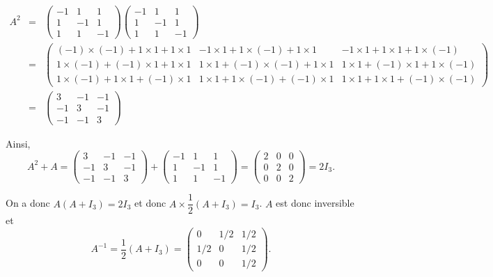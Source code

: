 \documentclass[11pt,fleqn]{book} %
\begin{document}
\begin{solution}\[\begin{array}{rcl}A^2 & =& \begin{pmatrix}-1 & 1 & 1\\1&-1&1\\1&1&-1 \end{pmatrix}\begin{pmatrix}-1 & 1 & 1\\1&-1&1\\1&1&-1 \end{pmatrix} \\
&=& \begin{pmatrix}(-1) \times (-1) +1\times 1 + 1 \times 1 & -1 \times 1 + 1 \times(-1) + 1 \times 1 & -1 \times 1 + 1 \times 1 + 1 \times(-1) \\ 1 \times (-1) + (-1) \times 1 + 1 \times 1 & 1 \times 1 + (-1) \times(-1) + 1 \times 1 & 1 \times 1 + (-1) \times 1 + 1 \times (-1) \\ 1 \times (-1) + 1 \times 1 + (-1) \times 1 & 1 \times 1 + 1 \times(-1) + (-1) \times 1 & 1 \times 1 + 1 \times 1 + (-1) \times (-1) \end{pmatrix} \\ &=& \begin{pmatrix}3 & -1 & -1 \\ -1 & 3 & -1 \\ -1&-1&3\end{pmatrix}\end{array}\]

Ainsi, 
\[A^2+A = \begin{pmatrix}3 & -1 & -1 \\ -1 & 3 & -1 \\ -1&-1&3\end{pmatrix} + \begin{pmatrix}-1 & 1 & 1\\1&-1&1\\1&1&-1 \end{pmatrix} = \begin{pmatrix}2&0&0\\0&2&0\\0&0&2\end{pmatrix} =2I_3.\]

On a donc \(A(A+I_3)=2I_3\) et donc \(A \times \dfrac{1}{2}(A+I_3)=I_3\). \(A\) est donc inversible et
\[A^{-1}= \dfrac{1}{2}(A+I_3) = \begin{pmatrix} 0 & 1/2 & 1/2 \\ 1/2 & 0 & 1/2 \\ 0 & 0 & 1/2\end{pmatrix}.\]\end{solution}
\end{document}
